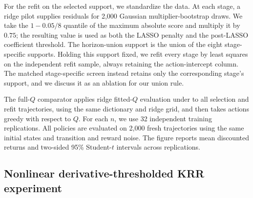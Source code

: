 \documentclass[opre,nonblindrev]{informs4}
\newenvironment{revision}{\begingroup\color{revisionblue}\ignorespaces}{\endgroup}
\begin{document}
\begin{revision}
For the refit on the selected support, we standardize the data. At each stage, a ridge
pilot supplies residuals for 2,000 Gaussian multiplier-bootstrap draws. We
take the $1-0.05/8$ quantile of the maximum absolute score and multiply it by
$0.75$; the resulting value is used as both the LASSO penalty and the
post-LASSO coefficient threshold. The horizon-union support is the union of
the eight stage-specific supports. Holding this support fixed, we refit every
stage by least squares on the independent refit sample, always retaining the
action-intercept column. The matched stage-specific screen instead retains only the corresponding stage's support, and we discuss it as an ablation for our union rule. 

 The full-$Q$ comparator applies ridge fitted-$Q$
evaluation under to all selection and refit
trajectories, using the same dictionary and ridge grid, and then takes actions greedy with respect to $Q$. 
For each $n$, we use 32 independent training replications. All policies are evaluated on 2,000 fresh trajectories using the
same initial states and transition and reward noise. The figure reports mean
discounted returns and two-sided 95\% Student-$t$ intervals across
replications.

\subsection{Nonlinear derivative-thresholded KRR experiment}
\label{app:nonlinear-krr-details}


\end{revision}
\end{document}
